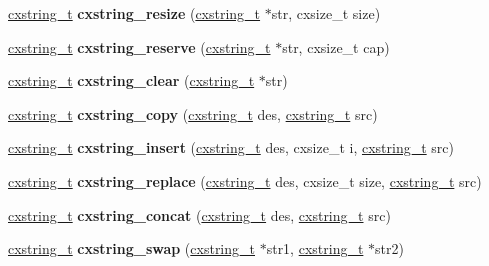 \begin{DoxyCompactItemize}
\item 
\mbox{\label{a00026_a7343a3c594bfd8dad231453d7dd37aff}} 
\hyperlink{a00072}{cxstring\+\_\+t} {\bfseries cxstring\+\_\+resize} (\hyperlink{a00072}{cxstring\+\_\+t} $\ast$str, cxsize\+\_\+t size)
\item 
\mbox{\label{a00026_a39baecb2e2cf07742bb2b3dadf4990d0}} 
\hyperlink{a00072}{cxstring\+\_\+t} {\bfseries cxstring\+\_\+reserve} (\hyperlink{a00072}{cxstring\+\_\+t} $\ast$str, cxsize\+\_\+t cap)
\item 
\mbox{\label{a00026_ab441e4a21aa272aa037d1ec140195178}} 
\hyperlink{a00072}{cxstring\+\_\+t} {\bfseries cxstring\+\_\+clear} (\hyperlink{a00072}{cxstring\+\_\+t} $\ast$str)
\item 
\mbox{\label{a00026_a634c9663066f29ff9707b8e2d3da2729}} 
\hyperlink{a00072}{cxstring\+\_\+t} {\bfseries cxstring\+\_\+copy} (\hyperlink{a00072}{cxstring\+\_\+t} des, \hyperlink{a00072}{cxstring\+\_\+t} src)
\item 
\mbox{\label{a00026_aeb237db78af114958984c938dba4f98c}} 
\hyperlink{a00072}{cxstring\+\_\+t} {\bfseries cxstring\+\_\+insert} (\hyperlink{a00072}{cxstring\+\_\+t} des, cxsize\+\_\+t i, \hyperlink{a00072}{cxstring\+\_\+t} src)
\item 
\mbox{\label{a00026_a39566cb811f44460e07107e8e99c1a33}} 
\hyperlink{a00072}{cxstring\+\_\+t} {\bfseries cxstring\+\_\+replace} (\hyperlink{a00072}{cxstring\+\_\+t} des, cxsize\+\_\+t size, \hyperlink{a00072}{cxstring\+\_\+t} src)
\item 
\mbox{\label{a00026_ac12a5c56e702611eb7c6006f1b691a38}} 
\hyperlink{a00072}{cxstring\+\_\+t} {\bfseries cxstring\+\_\+concat} (\hyperlink{a00072}{cxstring\+\_\+t} des, \hyperlink{a00072}{cxstring\+\_\+t} src)
\item 
\mbox{\label{a00026_aefa55d1bdf26f9672a87a004a4536ff8}} 
\hyperlink{a00072}{cxstring\+\_\+t} {\bfseries cxstring\+\_\+swap} (\hyperlink{a00072}{cxstring\+\_\+t} $\ast$str1, \hyperlink{a00072}{cxstring\+\_\+t} $\ast$str2)
\item 
\mbox{\label{a00026_ae82b55379c5523b993f2cd0dc35d8aac}} 

\end{DoxyCompactItemize}

